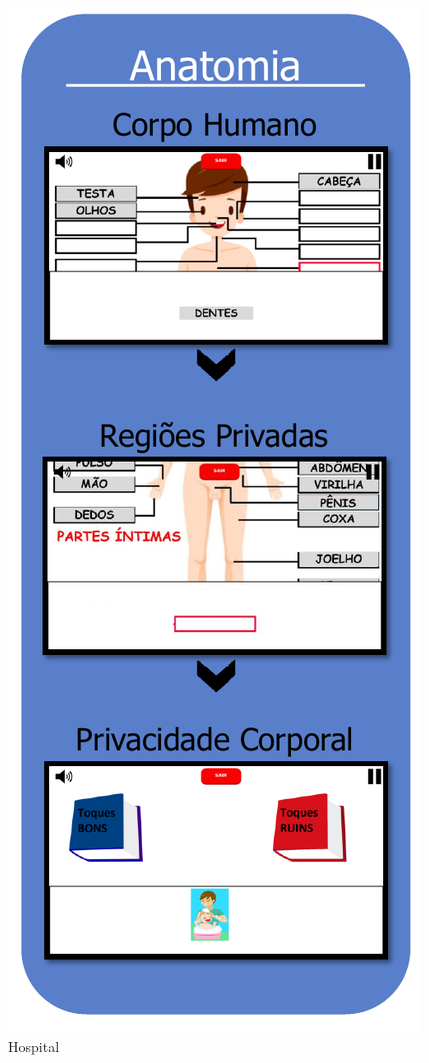 \begin{figure}%
  \vspace{-20pt}
  \caption{\label{fig:Hospitalzinho}Hospital}
  \includegraphics[width=\linewidth]{./Visuais/Hospital.pdf}
  \vspace{-1.0cm}
\end{figure}

